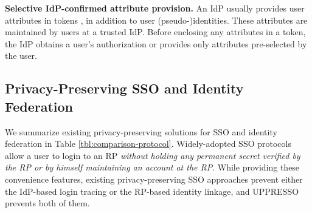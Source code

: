 
\noindent\textbf{Selective IdP-confirmed attribute provision.}
An IdP usually provides user attributes in tokens \cite{OpenIDConnect,rfc6749}, in addition to user (pseudo-)identities.
These attributes are maintained by users at a trusted IdP.
Before enclosing any attributes in a token, the IdP obtains a user's authorization or provides only attributes pre-selected by the user.

%



\subsection{Privacy-Preserving SSO and Identity Federation}
\label{subsec-solutions}

We summarize existing privacy-preserving solutions for SSO and identity federation in Table \ref{tbl:comparison-protocol}.
Widely-adopted SSO protocols \cite{OpenIDConnect,rfc6749,SAML,SAMLIdentifier} allow a user to login to an RP
\emph{without holding any permanent secret verified by the RP or by himself maintaining an account at the RP}.
While providing these convenience features, existing privacy-preserving SSO approaches \cite{BrowserID,SPRESSO,NIST2017draft} prevent either the IdP-based login tracing or the RP-based identity linkage, and UPPRESSO prevents both of them.


